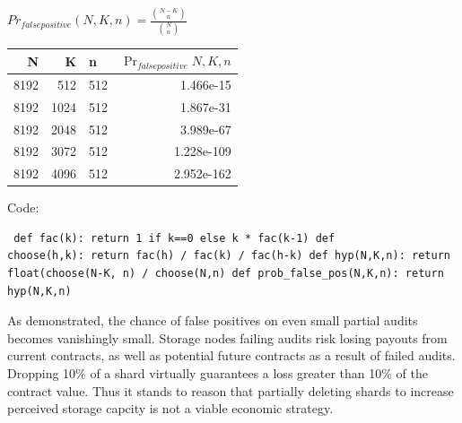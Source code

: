 \documentclass[a4paper,10pt]{article} \usepackage[utf8]{inputenc}
\begin{document}
{\centering $Pr_{false positive}(N,K,n) = \displaystyle \frac{{N-K \choose n}}
{{N \choose n}}$ \\}

\begin{table}[hbt!] \begin{center} \begin{tabular}{r r l r} N & K & n &
$\Pr_{falsepositive}{N,K,n}$\\ \hline 8192 & 512  & 512 & 1.466e-15\\ \hline
8192 & 1024 & 512 & 1.867e-31\\ \hline 8192 & 2048 & 512 & 3.989e-67\\ \hline
8192 & 3072 & 512 & 1.228e-109\\ \hline 8192 & 4096 & 512 & 2.952e-162\\
\end{tabular} \end{center} \end{table}

Code: \begin{lstlisting} def fac(k): return 1 if k==0 else k * fac(k-1) def
choose(h,k): return fac(h) / fac(k) / fac(h-k) def hyp(N,K,n): return
float(choose(N-K, n) / choose(N,n) def prob_false_pos(N,K,n): return hyp(N,K,n)
\end{lstlisting}

As demonstrated, the chance of false positives on even small partial audits
becomes vanishingly small. Storage nodes failing audits risk losing payouts from
current contracts, as well as potential future contracts as a result of failed
audits. Dropping 10\% of a shard virtually guarantees a loss greater than 10\%
of the contract value. Thus it stands to reason that partially deleting shards
to increase perceived storage capcity is not a viable economic strategy.













\newpage  \begingroup \raggedright
 \endgroup
\end{document}
